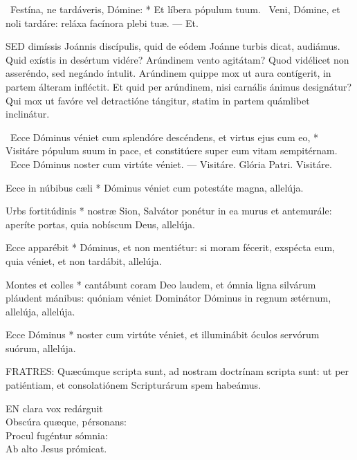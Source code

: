 \R\ Festína, ne tardáveris, Dómine: * Et líbera pópulum tuum. \V\ Veni, Dómine, et noli tardáre: reláxa facínora plebi tuæ. --- Et.


\lettrine[lines=2]{S}{ED} dimíssis Joánnis discípulis, quid de eódem Joánne turbis dicat, audiámus. Quid exístis in desértum vidére? Arúndinem vento agitátam? Quod vidélicet non asseréndo, sed negándo íntulit. Arúndinem quippe mox ut aura contígerit, in partem álteram infléctit. Et quid per arúndinem, nisi carnális ánimus designátur? Qui mox ut favóre vel detractióne tángitur, statim in partem quámlibet inclinátur.

\R\ Ecce Dóminus véniet cum splendóre descéndens, et virtus ejus cum eo, * Visitáre pópulum suum in pace, et constitúere super eum vitam sempitérnam. \V\ Ecce Dóminus noster cum virtúte véniet. --- Visitáre. Glória Patri. Visitáre.



 Ecce in núbibus cæli * Dóminus véniet cum potestáte magna, allelúja.


 Urbs fortitúdinis * nostræ Sion, Salvátor ponétur in ea murus et antemurále: aperíte portas, quia nobíscum Deus, allelúja.

 Ecce apparébit * Dóminus, et non mentiétur: si moram fécerit, exspécta eum, quia véniet, et non tardábit, allelúja.

 Montes et colles * cantábunt coram Deo laudem, et ómnia ligna silvárum pláudent mánibus: quóniam véniet Dominátor Dóminus in regnum ætérnum, allelúja, allelúja.

 Ecce Dóminus * noster cum virtúte véniet, et illuminábit óculos servórum suórum, allelúja.


\lettrine[lines=2]{F}{RATRES}: Quæcúmque scripta sunt, ad nostram doctrínam scripta sunt: ut per patiéntiam, et consolatiónem Scripturárum spem habeámus.


\lettrine[lines=2]{E}{N} clara vox redárguit\\
Obscúra quæque, pérsonans:\\
Procul fugéntur sómnia:\\
Ab alto Jesus prómicat.

